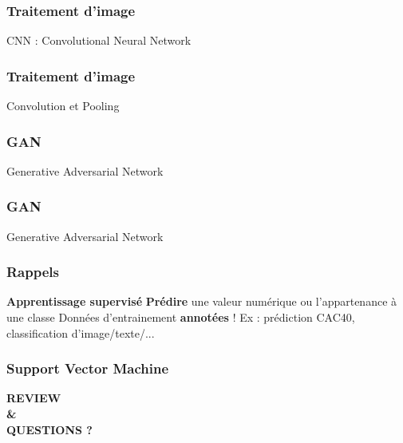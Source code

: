 \documentclass{formation}
\begin{document}
\begin{frame}
  \frametitle{Traitement d'image}
  \begin{center}
    CNN : Convolutional Neural Network
  \end{center}
\end{frame}

\begin{frame}
  \frametitle{Traitement d'image}
  \begin{center}
    Convolution et Pooling
  \end{center}
  \begin{minipage}[l]{0.40\linewidth}
  \end{minipage}\hfill
  \begin{minipage}[l]{0.59\linewidth}
  \end{minipage}\hfill
\end{frame}

\begin{frame}
  \frametitle{GAN}
  \begin{center}
    Generative Adversarial Network
  \end{center}
\end{frame}

\begin{frame}
  \frametitle{GAN}
  \begin{center}
    Generative Adversarial Network
  \end{center}
\end{frame}

\begin{frame}
\frametitle{Rappels}
  \textbf{Apprentissage supervisé}
  \newline \newline
  \textbf{Prédire} une valeur numérique ou l'appartenance à une classe
  \newline
  Données d'entrainement \textbf{annotées} !
  \newline \newline
  Ex : prédiction CAC40, classification d'image/texte/...
\end{frame}

\begin{frame}
  \frametitle{Support Vector Machine}
  \begin{center}
   \textbf{REVIEW \\ \& \\ QUESTIONS ?}
  \end{center}
\end{frame}
\end{document}
